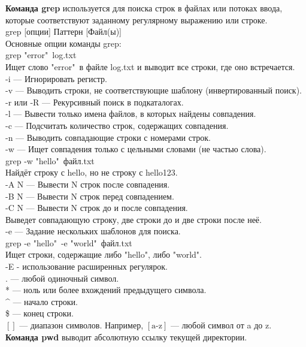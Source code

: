 \noindent \textbf{Команда grep} используется для поиска строк в файлах или потоках ввода, которые соответствуют заданному регулярному выражению или строке. \\
grep [опции] Паттерн [Файл(ы)] \\
Основные опции команды grep: \\
grep "error"\ log.txt \\
Ищет слово "error"\ в файле log.txt и  выводит все строки, где оно встречается. \\
-i — Игнорировать регистр. \\
-v — Выводить строки, не соответствующие шаблону (инвертированный поиск). \\
-r или -R — Рекурсивный поиск в подкаталогах. \\
-l — Вывести только имена файлов, в которых найдены совпадения. \\
-c — Подсчитать количество строк, содержащих совпадения. \\
-n — Выводить совпадающие строки с номерами строк. \\
-w — Ищет совпадения только с цельными словами (не частью слова). \\
grep -w "hello"\ файл.txt \\
Найдёт строку с hello, но не строку с hello123. \\
-A N — Вывести N строк после совпадения. \\
-B N — Вывести N строк перед совпадением. \\
-C N — Вывести N строк до и после совпадения. \\
Выведет совпадающую строку, две строки до и две строки после неё. \\
-e — Задание нескольких шаблонов для поиска. \\
grep -e "hello"\ -e "world"\ файл.txt \\
Ищет строки, содержащие либо "hello", либо "world". \\
-E - использование расширенных регулярок. \\
. — любой одиночный символ. \\
* — ноль или более вхождений предыдущего символа. \\
\^{} — начало строки. \\
\$ — конец строки. \\
$[]$ — диапазон символов. Например, $[\text{a-z}]$ — любой символ от a до z. \\

\noindent \textbf{Команда pwd} выводит абсолютную ссылку текущей директории. \\

